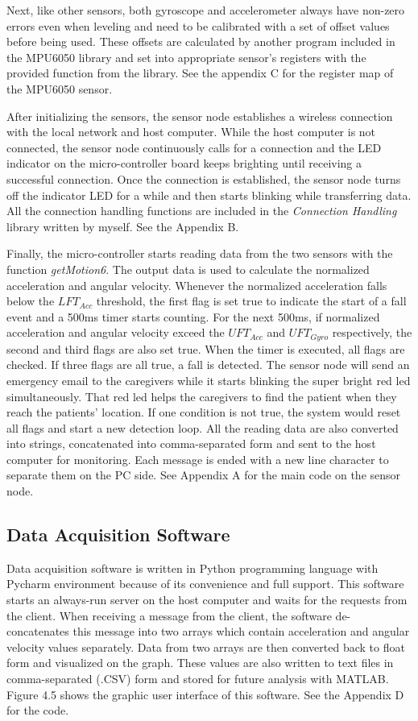 \documentclass[letterpaper,12pt,titlepage,oneside,final]{book}
\begin{document}
Next, like other sensors, both gyroscope and accelerometer always have non-zero errors even when leveling and need to be calibrated with a set of offset values before being used. These offsets are calculated by another program included in the MPU6050 library and set into appropriate sensor's registers with the provided function from the library. See the appendix C for the register map of the MPU6050 sensor. \par
After initializing the sensors, the sensor node establishes a wireless connection with the local network and host computer. While the host computer is not connected, the sensor node continuously calls for a connection and the LED indicator on the micro-controller board keeps brighting until receiving a successful connection. Once the connection is established, the sensor node turns off the indicator LED for a while and then starts blinking while transferring data. All the connection handling functions are included in the \textit{Connection Handling} library written by myself. See the Appendix B.\par 

Finally, the micro-controller starts reading data from the two sensors with the function \textit{getMotion6}. The output data is used to calculate the normalized acceleration and angular velocity. Whenever the normalized acceleration falls below the $LFT_{Acc}$ threshold, the first flag is set true to indicate the start of a fall event and a 500ms timer starts counting. For the next 500ms, if normalized acceleration and angular velocity exceed the $UFT_{Acc}$ and $UFT_{Gyro}$ respectively, the second and third flags are also set true. When the timer is executed, all flags are checked. If three flags are all true, a fall is detected. The sensor node will send an emergency email to the caregivers while it starts blinking the super bright red led simultaneously. That red led helps the caregivers to find the patient when they reach the patients' location. If one condition is not true, the system would reset all flags and start a new detection loop. All the reading data are also converted into strings, concatenated into comma-separated form and sent to the host computer for monitoring. Each message is ended with a new line character to separate them on the PC side. See Appendix A for the main code on the sensor node. 
\subsection{Data Acquisition Software}
Data acquisition software is written in Python programming language with Pycharm environment because of its convenience and full support. This software starts an always-run server on the host computer and waits for the requests from the client. When receiving a message from the client, the software de-concatenates this message into two arrays which contain acceleration and angular velocity values separately.  Data from two arrays are then converted back to float form and visualized on the graph. These values are also written to text files in comma-separated (.CSV) form and stored for future analysis with MATLAB. Figure 4.5 shows the graphic user interface of this software. See the Appendix D for the code. 
 
\end{document}
